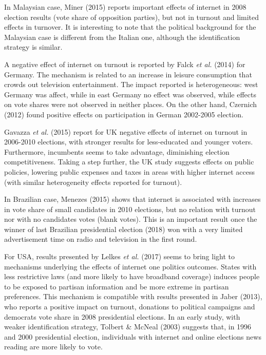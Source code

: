 \documentclass[
  12pt,
]{article}
\begin{document}
In Malaysian case, Miner (2015) reports important effects of internet in
2008 election results (vote share of opposition parties), but not in
turnout and limited effects in turnover. It is interesting to note that
the political background for the Malaysian case is different from the
Italian one, although the identification strategy is similar.

A negative effect of internet on turnout is reported by Falck \emph{et
al.} (2014) for Germany. The mechanism is related to an increase in
leisure consumption that crowds out television entertainment. The impact
reported is heterogeneous: west Germany was affect, while in east
Germany no effect was observed, while effects on vote shares were not
observed in neither places. On the other hand, Czernich (2012) found
positive effects on participation in German 2002-2005 election.

Gavazza \emph{et al.} (2015) report for UK negative effects of internet
on turnout in 2006-2010 elections, with stronger results for
less-educated and younger voters. Furthermore, incumbents seems to take
advantage, diminishing election competitiveness. Taking a step further,
the UK study suggests effects on public policies, lowering public
expenses and taxes in areas with higher internet access (with similar
heterogeneity effects reported for turnout).

In Brazilian case, Menezes (2015) shows that internet is associated with
increases in vote share of small candidates in 2010 elections, but no
relation with turnout nor with no candidates votes (blank votes). This
is an important result once the winner of last Brazilian presidential
election (2018) won with a very limited advertisement time on radio and
television in the first round.

For USA, results presented by Lelkes \emph{et al.} (2017) seems to bring
light to mechanisms underlying the effects of internet one politics
outcomes. States with less restrictive laws (and more likely to have
broadband coverage) induces people to be exposed to partisan information
and be more extreme in partisan preferences. This mechanism is
compatible with results presented in Jaber (2013), who reports a
positive impact on turnout, donations to political campaigns and
democrats vote share in 2008 presidential elections. In an early study,
with weaker identification strategy, Tolbert \& McNeal (2003) suggests
that, in 1996 and 2000 presidential election, individuals with internet
and online elections news reading are more likely to vote.
\end{document}
